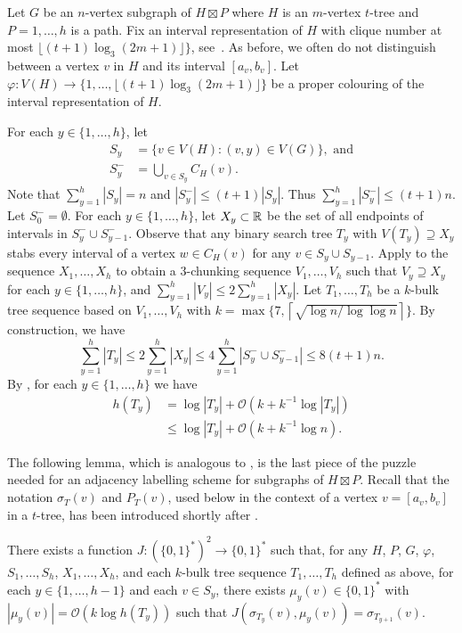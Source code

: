 \documentclass[kpfonts]{patmorin}
\newcommand{\Oh}{\mathcal{O}}
\let\le\leqslant
\let\leq\leqslant
\begin{document}
Let $G$ be an $n$-vertex subgraph of $H\boxtimes P$ where $H$ is an $m$-vertex $t$-tree and $P=1,\ldots,h$ is a path. 
Fix an interval representation of $H$ with clique number at most $\lfloor(t+1)\log_3 (2m+1)\rfloor\}$, see~. 
As before, we often do not distinguish between a vertex $v$ in $H$ and its interval $[a_v,b_v]$.
Let $\varphi:V(H)\to\{1,\ldots,\lfloor(t+1)\log_3 (2m+1)\rfloor\}$ be a proper colouring of the interval representation of $H$.

For each $y\in\{1,\ldots,h\}$, let 
\begin{align*}
S_y&=\{v\in V(H): (v,y)\in V(G)\}, \text{ and}\\
S^-_y&=\textstyle\bigcup_{v\in S_y} C_H(v).
\end{align*}
Note that $\sum_{y=1}^h |S_y| =n$ and $|S_y^-| \leq (t+1)|S_y|$. 
Thus $\sum_{y=1}^h |S_y^-| \leq (t+1)n$. 
Let $S^-_0=\emptyset$. 
For each $y\in\{1,\ldots,h\}$, let $X_y\subset\mathbb{R}$ be the set of all endpoints of intervals in $S^-_y\cup S^-_{y-1}$. 
Observe that any binary search tree $T_y$ with $V(T_y)\supseteq X_y$ stabs every interval of a vertex $w\in C_H(v)$ for any $v\in S_y\cup S_{y-1}$.
Apply  to the sequence $X_1,\ldots,X_h$ to obtain a $3$-chunking sequence $V_1,\ldots,V_{h}$ such that $V_y\supseteq X_y$ for each $y\in\{1,\ldots,h\}$, and $\sum_{y=1}^h |V_y|\le 2\sum_{y=1}^h |X_y|$.
Let $T_1,\ldots,T_h$ be a $k$-bulk tree sequence based on $V_1,\ldots,V_{h}$ with $k=\max\{7,\left\lceil\sqrt{\log n / \log\log n}\right\rceil\}$.
By construction, we have
\[
\textstyle\sum_{y=1}^h |T_y| \le 2\textstyle\sum_{y=1}^h |X_y| \le 4\textstyle\sum_{y=1}^h |S^-_y\cup S^-_{y-1}| \le 8(t+1)n.
\]
By , for each $y\in\{1,\ldots,h\}$ we have
\begin{align*}
h(T_y)&= \log |T_y| + \Oh(k+k^{-1}\log |T_y|)\\
&\leq \log |T_y| + \Oh(k+k^{-1}\log n).
\end{align*}

The following lemma, which is analogous to , is the last piece of the puzzle needed for an adjacency labelling scheme for subgraphs of $H\boxtimes P$. Recall that the notation $\sigma_T(v)$ and $P_T(v)$, used below in the context of a vertex $v=[a_v,b_v]$ in a $t$-tree, has been introduced shortly after .

\begin{lem}
  There exists a function $J:(\{0,1\}^*)^2\to \{0,1\}^*$ such that, 
  for any $H$, $P$, $G$, $\varphi$, $S_1,\ldots,S_h$, $X_1,\ldots,X_h$, and each $k$-bulk tree sequence $T_1,\ldots,T_h$ defined as above, for each $y\in\{1,\ldots,h-1\}$ and each $v\in S_y$, there exists $\mu_y(v)\in\{0,1\}^*$ with $|\mu_y(v)|= \Oh(k\log h(T_y))$ such that $J(\sigma_{T_y}(v), \mu_y(v))=\sigma_{T_{y+1}}(v)$.
\end{lem}
\end{document}
